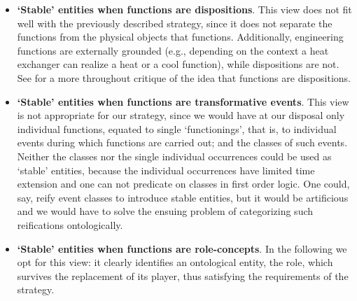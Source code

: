 \documentclass[
]{ceurart}
\begin{document}
\begin{itemize}
  \item \textbf{`Stable' entities when functions are dispositions}. This view does not fit well with the previously described strategy, since it does not separate the functions from the physical objects that functions. Additionally, engineering functions are externally grounded (e.g., depending on the context a heat exchanger can realize a heat or a cool function), while dispositions are not. See \cite{rohlWhyFunctionsAre2014} for a more throughout critique of the idea that functions are dispositions. %
  \item \textbf{`Stable' entities when functions are transformative events}. %
   This view is not appropriate  %
   for our strategy, since we would have at our disposal only individual functions, equated to single `functionings', that is, to individual events during which functions are carried out; and the classes of such events. Neither the classes nor the single individual occurrences could be used as `stable' entities, because the individual occurrences have limited time extension and one can not predicate on classes in first order logic.
   One could, say, reify event classes to introduce stable entities, but it would be artificious and we would have to solve the ensuing problem of categorizing such reifications ontologically. %
  \item \textbf{`Stable' entities when functions are role-concepts}. In the following we opt for this view: it clearly identifies an ontological entity, the role, which survives the replacement of its player, thus satisfying the requirements of the strategy. 
\end{itemize}
\end{document}
